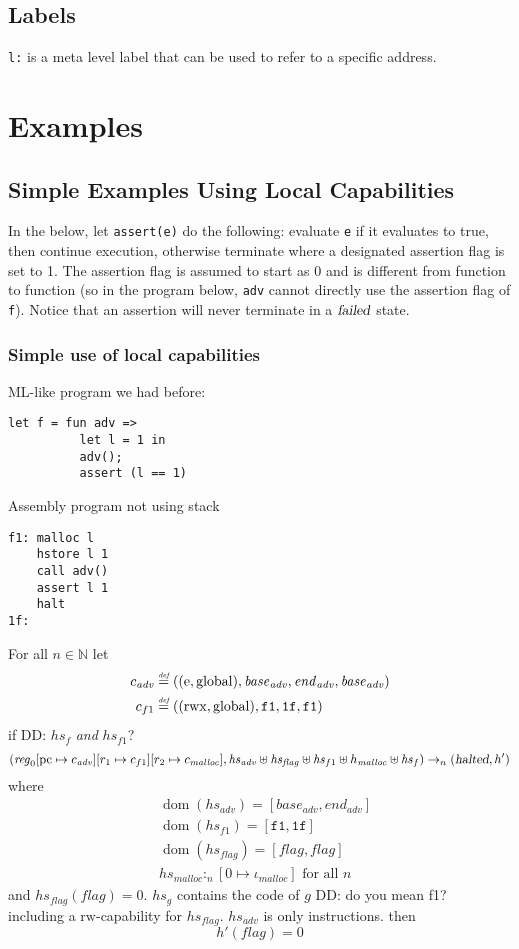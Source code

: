 \documentclass[a4paper]{article}
\newcommand{\update}[2]{[#1 \mapsto #2]}
\newcommand{\defeq}{\stackrel{\textit{\tiny{def}}}{=}}
\DeclareMathOperator{\dom}{dom}
\newcommand\dominique[1]{{\color{purple} \sf \footnotesize {DD: #1}}\\}
\newcommand{\var}[1]{\mathit{#1}}
\newcommand{\hs}{\var{hs}}
\newcommand{\pcreg}{\mathrm{pc}}
\newcommand{\start}{\var{base}}
\newcommand{\addrend}{\var{end}}
\newcommand{\reg}{\var{reg}}
\newcommand{\heap}{\var{heap}}
\newcommand{\adv}{\var{adv}}
\newcommand{\flag}{\var{flag}}
\newcommand{\failed}{\textsl{failed}}
\newcommand{\halted}{\textsl{halted}}
\newcommand{\heapSat}[3][\heap]{#1 :_{#2} #3}
\newcommand{\codelabel}[1]{\mathit{#1}}
\newcommand{\malloc}{\codelabel{malloc}}
\newcommand{\nats}{\mathbb{N}}
\newcommand{\plainperm}[1]{\mathrm{#1}}
\newcommand{\readwrite}{\plainperm{rw}}
\newcommand{\entry}{\plainperm{e}}
\newcommand{\rwx}{\plainperm{rwx}}
\newcommand{\glob}{\plainperm{global}}
\newcommand{\step}[1][]{\rightarrow_{#1}}
\begin{document}
\subsection{Labels}
\texttt{l:} is a meta level label that can be used to refer to a specific address.

\section{Examples}
\label{sec:examples}
\subsection{Simple Examples Using Local Capabilities}
\label{subsec:example-loc-cap}
In the below, let \texttt{assert(e)} do the following: evaluate \texttt{e} if it evaluates to true, then continue execution, otherwise terminate where a designated assertion flag is set to 1. The assertion flag is assumed to start as 0 and is different from function to function (so in the program below, \texttt{adv} cannot directly use the assertion flag of \texttt{f}). Notice that an assertion will never terminate in a $\failed$ state.
\subsubsection{Simple use of local capabilities}
ML-like program we had before:
\begin{verbatim}
let f = fun adv =>
          let l = 1 in
          adv();
          assert (l == 1)
\end{verbatim}
Assembly program not using stack
\begin{verbatim}
f1: malloc l
    hstore l 1
    call adv()
    assert l 1
    halt
1f:
\end{verbatim}
\begin{lemma}
  For all $n \in \nats$
  let
  \begin{align*}
    c_{\var{adv}} & \defeq ((\entry,\glob),\start_{\adv},\addrend_{\adv},\start_{\adv}) \\
    c_{f1} & \defeq ((\rwx,\glob),\mathtt{f1},\mathtt{1f},\mathtt{f1}) \\
  \end{align*}
if \dominique{$\hs_f$ \emph{and} $\hs_{f1}$?}
  \[
    (\reg_0\update{\pcreg}{c_{\adv}}
          \update{r_1}{c_{f1}}\update{r_2}{c_\malloc},\hs_\adv \uplus \hs_\flag \uplus \hs_{f1} \uplus h_{\malloc} \uplus \hs_f) \step[n] (\halted,h')
  \]
where 
\begin{align*}
  &\dom(\hs_{\adv}) = [\start_\adv,\addrend_\adv] \\
  &\dom(\hs_{f1}) = [\mathtt{f1},\mathtt{1f}] \\
  &\dom(\hs_\flag) = [\flag,\flag] \\
  &\heapSat[\hs_{\malloc}]{n}{[0 \mapsto \iota_{\malloc}]} \text{ for all } n
\end{align*}
and $hs_\flag(\flag) = 0$. $hs_g$ contains the code of $g$ \dominique{do you mean f1?} including a $\readwrite$-capability for $\hs_\flag$. $\hs_\adv$ is only instructions.
then
\[
  h'(\flag) = 0
\]  
\end{lemma}
\end{document}
